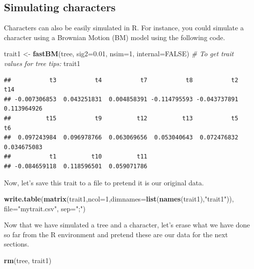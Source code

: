 \documentclass[
]{book}
\newenvironment{Shaded}{\begin{snugshade}}{\end{snugshade}}
\newcommand{\AttributeTok}[1]{\textcolor[rgb]{0.13,0.29,0.53}{#1}}
\newcommand{\CommentTok}[1]{\textcolor[rgb]{0.56,0.35,0.01}{\textit{#1}}}
\newcommand{\ConstantTok}[1]{\textcolor[rgb]{0.56,0.35,0.01}{#1}}
\newcommand{\DecValTok}[1]{\textcolor[rgb]{0.00,0.00,0.81}{#1}}
\newcommand{\FloatTok}[1]{\textcolor[rgb]{0.00,0.00,0.81}{#1}}
\newcommand{\FunctionTok}[1]{\textcolor[rgb]{0.13,0.29,0.53}{\textbf{#1}}}
\newcommand{\NormalTok}[1]{#1}
\newcommand{\OtherTok}[1]{\textcolor[rgb]{0.56,0.35,0.01}{#1}}
\newcommand{\StringTok}[1]{\textcolor[rgb]{0.31,0.60,0.02}{#1}}
\begin{document}
\subsection{Simulating characters}\label{simulating-characters}

Characters can also be easily simulated in R. For instance, you could simulate a character using a Brownian Motion (BM) model using the following code.

\begin{Shaded}
\begin{Highlighting}[]
\NormalTok{trait1 }\OtherTok{\textless{}{-}} \FunctionTok{fastBM}\NormalTok{(tree, }\AttributeTok{sig2=}\FloatTok{0.01}\NormalTok{, }\AttributeTok{nsim=}\DecValTok{1}\NormalTok{, }\AttributeTok{internal=}\ConstantTok{FALSE}\NormalTok{)}
\CommentTok{\# To get trait values for tree tips:}
\NormalTok{trait1}
\end{Highlighting}
\end{Shaded}

\begin{verbatim}
##           t3           t4           t7           t8           t2          t14 
## -0.007306853  0.043251831  0.004858391 -0.114795593 -0.043737891  0.113964926 
##          t15           t9          t12          t13           t5           t6 
##  0.097243984  0.096978766  0.063069656  0.053040643  0.072476832  0.034675083 
##           t1          t10          t11 
## -0.084659118  0.118596501  0.059071786
\end{verbatim}

Now, let's save this trait to a file to pretend it is our original data.

\begin{Shaded}
\begin{Highlighting}[]
\FunctionTok{write.table}\NormalTok{(}\FunctionTok{matrix}\NormalTok{(trait1,}\AttributeTok{ncol=}\DecValTok{1}\NormalTok{,}\AttributeTok{dimnames=}\FunctionTok{list}\NormalTok{(}\FunctionTok{names}\NormalTok{(trait1),}\StringTok{"trait1"}\NormalTok{)), }\AttributeTok{file=}\StringTok{"mytrait.csv"}\NormalTok{, }\AttributeTok{sep=}\StringTok{";"}\NormalTok{)}
\end{Highlighting}
\end{Shaded}

Now that we have simulated a tree and a character, let's erase what we have done so far from the R environment and pretend these are our data for the next sections.

\begin{Shaded}
\begin{Highlighting}[]
\FunctionTok{rm}\NormalTok{(tree, trait1)}
\end{Highlighting}
\end{Shaded}
\end{document}
